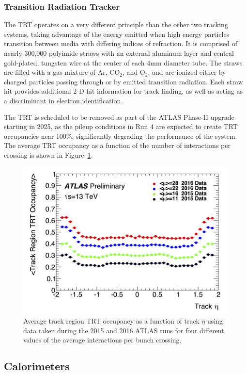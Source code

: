 \subsubsection{Transition Radiation Tracker}

The TRT operates on a very different principle than the other two tracking systems, taking advantage of the energy emitted when high energy particles transition between media with differing indices of refraction.  It is comprised of nearly 300,000 polyimide straws with an external aluminum layer and central gold-plated, tungsten wire at the center of each 4mm diameter tube.  The straws are filled with a gas mixture of Ar, CO$_2$, and O$_2$, and are ionized either by charged particles passing through or by emitted transition radiation.  Each straw hit provides additional 2-D hit information for track finding, as well as acting as a discriminant in electron identification.

The TRT is scheduled to be removed as part of the ATLAS Phase-II upgrade starting in 2025, as the pileup conditions in Run 4 are expected to create TRT occupancies near 100\%, significantly degrading the performance of the system. The average TRT occupancy as a function of the number of interactions per crossing is shown in Figure~\ref{fig:TRTOccupancy}.  

\begin{figure}[h!]
	\centering
	\includegraphics[width=0.6\columnwidth]{figures/Detector/TRTOccupancy.png}
	\caption{Average track region TRT occupancy as a function of track $\eta$ using data taken during the 2015 and 2016 ATLAS runs for four different values of the average interactions per bunch crossing.
	}
	\label{fig:TRTOccupancy}
\end{figure}

\subsection{Calorimeters}


